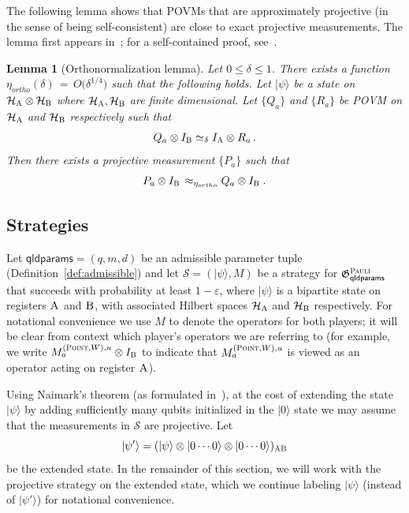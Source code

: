 \documentclass[11pt]{article}
\newtheorem{lemma}[theorem]{Lemma}
\theoremstyle{definition}
\newcommand{\ket}[1]{|#1\rangle}
\newcommand{\Id}{\ensuremath{I}}
\newcommand{\mH}{\ensuremath{\mathcal{H}}}
\newcommand{\eps}{\varepsilon}
\newcommand{\game}{\mathfrak{G}}
\newcommand{\strategy}{\mathscr{S}}
\newcommand{\gamestyle}[1]{\ensuremath{\textsc{#1}}\xspace}
\newcommand{\pauli}{\gamestyle{Pauli}}
\newcommand{\labelstyle}[1]{\ensuremath{\textsc{#1}}\xspace}
\newcommand{\alice}{\labelstyle{A}}
\newcommand{\bob}{\labelstyle{B}}
\newcommand{\typestyle}[1]{\ensuremath{\textsc{#1}}\xspace}
\newcommand{\Point}{\typestyle{Point}}
\newcommand{\abc}[1][\delta]{\otimes I_\bob \simeq_{#1} I_\alice \otimes}
\newcommand{\qldparams}{\mathsf{qldparams}}
\begin{document}
The following lemma shows that POVMs that are approximately projective (in the sense of being self-consistent) are close to exact projective measurements. The lemma first appears in~\cite{KV11}; for a self-contained proof, see~\cite{ML20}.

\begin{lemma}[Orthonormalization lemma]\label{lem:ortho}
Let $0\leq \delta\leq 1$. There exists a function $\eta_{ortho}(\delta)\,=\, O\big(\delta^{1/4}\big)$ such that the following holds.  Let $\ket{\psi}$ be a state on $\mH_\alice \otimes \mH_\bob$ where $\mH_\alice,\mH_\bob$ are finite dimensional. Let $\{Q_a\}$ and $\{R_a\}$ be POVM on $\mH_\alice$ and $\mH_\bob$ respectively such that 
\begin{equation}\label{eq:cons-cond} 
Q_a \abc R_a \,.
\end{equation}
Then there exists a projective measurement $\{P_a\}$ such that
\begin{equation}\label{eq:cons-ccl}
  P_a \otimes \Id_\bob \,\approx_{\eta_{ortho}} Q_a \otimes \Id_\bob \;.
\end{equation}
\end{lemma}









 \newcommand{\acom}{\typestyle{Anticom}}

\subsection{Strategies}
\label{sec:commutation}

  Let $\qldparams = (q,m,d)$ be an admissible parameter tuple (Definition~\ref{def:admissible}) and let
  $\strategy = (\ket{\psi},M)$ be a strategy for
  $\game^\pauli_\qldparams$ that succeeds with probability at least $1 - \eps$, where $\ket{\psi}$ is a bipartite state on registers $\alice$ and $\bob$, with associated Hilbert spaces $\mH_\alice$ and $\mH_\bob$ respectively. For notational convenience we use $M$ to denote the operators for both players; it will be clear from context which player's operators we are referring to (for example, we write $M^{(\Point,W),u}_a \otimes \Id_\bob$ to indicate that $M^{(\Point,W),u}_a$ is viewed as an operator acting on register $\alice$).
  
  Using Naimark's
  theorem (as formulated in~\cite[Theorem 5.1]{ML20}), at the cost of
  extending the state $\ket{\psi}$ by adding sufficiently many qubits
  initialized in the $\ket{0}$ state we may assume
  that the measurements in $\strategy$ are projective. Let
  \[ \ket{\psi'} = (\ket{\psi} \otimes \ket{0 \cdots 0} \otimes \ket{0
      \cdots 0})_{\alice \bob} \]
  be the extended state. In the remainder of this section, we
  will work with the projective strategy on the extended state, which we continue labeling $\ket{\psi}$ (instead of $\ket{\psi'}$) for notational convenience.
\end{document}
